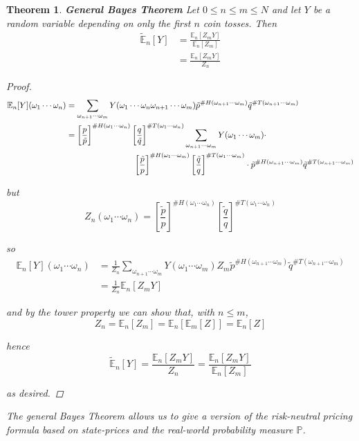 \documentclass[12pt]{article}
\newtheorem{theorem}{Theorem}
\newlength\tindent
\renewcommand{\indent}{\hspace*{\tindent}}
\renewcommand{\P}{\mathbb P}
\newcommand{\E}{\mathbb E}
\begin{document}
\begin{theorem}{\bf General Bayes Theorem} Let $0 \leq n \leq m \leq N$ and let $Y$ be a random variable depending on only the first $n$ coin tosses. Then
\begin{align*}
	\tilde{\E}_n[Y] &= \frac{ \E_n[Z_mY] }{ \E_n[Z_m] } \\
	&= \frac{ \E_n[Z_m Y] }{ Z_n } 
\end{align*} 

\begin{proof} 
\begin{align*}
	\E_n[Y](\omega_1\cdots\omega_n) &= \sum_{\omega_{n + 1}\cdots\omega_m} Y(\omega_1\cdots\omega_n\omega_{n + 1}\cdots\omega_m) \tilde{p}^{\#H(\omega_{n + 1}\cdots\omega_m)} \tilde{q}^{\#T(\omega_{n + 1}\cdots\omega_m)} \\
	&= \left[ \frac{p}{\tilde{p}} \right]^{\#H(\omega_1\cdots\omega_n)} \left[ \frac{ q }{\tilde{q}} \right]^{\#T(\omega_1\cdots\omega_n)} \sum_{\omega_{n + 1}\cdots\omega_m} Y(\omega_1\cdots\omega_m) \cdot \\
	&\hphantom{{}={-------}} \left[ \frac{\tilde{p}}{p} \right]^{\#H(\omega_1\cdots\omega_m)} \left[ \frac{\tilde{q}}{q} \right]^{\#T(\omega_1\cdots\omega_m)} \cdot	
	 \tilde{p}^{\#H(\omega_{n + 1}\cdots\omega_m)} \tilde{q}^{\#T(\omega_{n + 1}\cdots\omega_m)}
\end{align*}

but 
\begin{equation*}
	Z_n(\omega_1\cdots\omega_n) = \left[ \frac{\tilde{p}}{p} \right]^{\#H(\omega_1\cdots\omega_n)} \left[ \frac{\tilde{q}}{q} \right]^{\#T(\omega_1\cdots\omega_n)} 
\end{equation*}

so
\begin{align*}
	\E_n[Y](\omega_1\cdots\omega_n) &= \frac{1}{Z_n} \sum_{\omega_{n + 1} \cdots \omega_m} Y(\omega_1\cdots\omega_m) Z_m \tilde{p}^{\#H(\omega_{n + 1}\cdots\omega_m)} \tilde{q}^{\#T(\omega_{n + 1}\cdots\omega_m)} \\
	&= \frac{1}{Z_n} \E_n[Z_mY] 
\end{align*}

and by the tower property we can show that, with $n \leq m$,
\begin{equation*}
	Z_n = \E_n[Z_m] = \E_n[\E_m[Z]] = \E_n[Z]
\end{equation*}

hence
\begin{equation*}
	\tilde{\E}_n[Y] = \frac{ \E_n[Z_mY] }{Z_n} = \frac{ \E_n[Z_mY] }{ \E_n[Z_m] }
\end{equation*}

as desired.
\end{proof}

\indent The general Bayes Theorem allows us to give a version of the risk-neutral pricing formula based on state-prices and the real-world probability measure $\P$.
\end{theorem}
\end{document}
